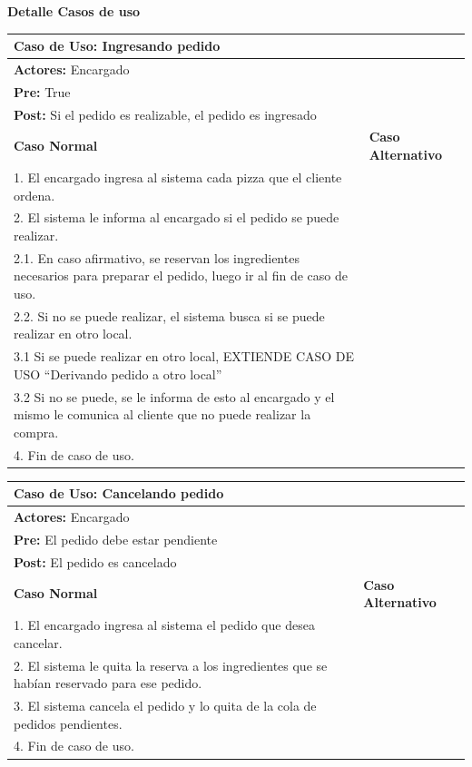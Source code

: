 \documentclass[a4paper,11pt] {article}
\begin{document}
\textbf{Detalle Casos de uso}

\begin{center}
	\begin{tabular}{ | p{6.5cm} | p{6.5cm} | }
		\hline
			\multicolumn{2}{|l|}{\textbf{Caso de Uso:} Ingresando pedido} \\
		\hline
			\multicolumn{2}{|l|}{\textbf{Actores:} Encargado} \\
		\hline
			\multicolumn{2}{|l|}{\textbf{Pre:} True} \\
		\hline
			\multicolumn{2}{|l|}{\textbf{Post:} Si el pedido es realizable, el pedido es ingresado} \\
		\hline
			\textbf{Caso Normal} & \textbf{Caso Alternativo}	\\
		\hline
		1. El encargado ingresa al sistema cada pizza que el cliente ordena. &	\\
		\hline
		2. El sistema le informa al encargado si el pedido se puede realizar. &	\\
		\hline
		2.1. En caso afirmativo, se reservan los ingredientes necesarios para preparar el pedido, luego ir al fin de caso de uso. &	\\
		\hline
		2.2. Si no se puede realizar, el sistema busca si se puede realizar en otro local. &	\\
		\hline
		3.1 Si se puede realizar en otro local, EXTIENDE CASO DE USO "`Derivando pedido a otro local"' &	\\
		\hline
		3.2 Si no se puede, se le informa de esto al encargado y el mismo le comunica al cliente que no puede realizar la compra. &	\\
		\hline
		4. Fin de caso de uso. &	\\
		\hline
	\end{tabular}
\end{center}

\begin{center}
	\begin{tabular}{ | p{6.5cm} | p{6.5cm} | }
		\hline
			\multicolumn{2}{|l|}{\textbf{Caso de Uso:} Cancelando pedido} \\
		\hline
			\multicolumn{2}{|l|}{\textbf{Actores:} Encargado} \\
		\hline
			\multicolumn{2}{|l|}{\textbf{Pre:} El pedido debe estar pendiente} \\
		\hline
			\multicolumn{2}{|l|}{\textbf{Post:} El pedido es cancelado} \\
		\hline
		\textbf{Caso Normal} & \textbf{Caso Alternativo}	\\
		\hline
		1. El encargado ingresa al sistema el pedido que desea cancelar. &	\\
		\hline
		2. El sistema le quita la reserva a los ingredientes que se hab\'ian reservado para ese pedido. &	\\
		\hline
		3. El sistema cancela el pedido y lo quita de la cola de pedidos pendientes. &	\\
		\hline
		4. Fin de caso de uso. &	\\
		\hline
	\end{tabular}
\end{center}
\end{document}
